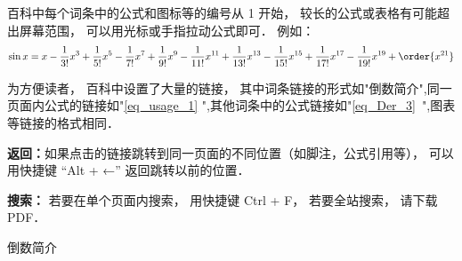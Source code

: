 
\begin{issues}
\issueDraft
\end{issues}

百科中每个词条中的公式和图标等的编号从 1 开始， 较长的公式或表格有可能超出屏幕范围， 可以用光标或手指拉动公式即可． 例如：
\begin{equation}\label{eq_usage_1}
\sin x = x - \frac{1}{3!} x^3 + \frac{1}{5!} x^5 - \frac{1}{7!} x^7+\frac{1}{9!} x^9-\frac{1}{11!} x^{11}+\frac{1}{13!} x^{13}-\frac{1}{15!} x^{15}+\frac{1}{17!} x^{17}-\frac{1}{19!} x^{19}+ \order{x^{21}}
\end{equation}

为方便读者， 百科中设置了大量的链接， 其中词条链接的形式如"倒数简介",同一页面内公式的链接如"\autoref{eq_usage_1} ",其他词条中的公式链接如"\autoref{eq_Der_3}~",图表等链接的格式相同．

\textbf{返回：}如果点击的链接跳转到同一页面的不同位置（如脚注，公式引用等）， 可以用快捷键 “Alt + ←” 返回跳转以前的位置．

\textbf{搜索：} 若要在单个页面内搜索， 用快捷键 Ctrl + F， 若要全站搜索， 请下载 PDF．

倒数简介